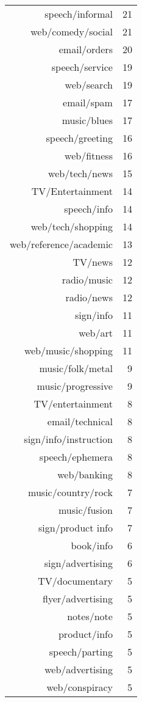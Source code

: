\begin{table}[ht]
\begin{tabular}{rr}
  speech/informal &  21 \\ 
  web/comedy/social &  21 \\ 
  email/orders &  20 \\ 
  speech/service &  19 \\ 
  web/search &  19 \\ 
  email/spam &  17 \\ 
  music/blues &  17 \\ 
  speech/greeting &  16 \\ 
  web/fitness &  16 \\ 
  web/tech/news &  15 \\ 
  TV/Entertainment &  14 \\ 
  speech/info &  14 \\ 
  web/tech/shopping &  14 \\ 
  web/reference/academic &  13 \\ 
  TV/news &  12 \\ 
  radio/music &  12 \\ 
  radio/news &  12 \\ 
  sign/info &  11 \\ 
  web/art &  11 \\ 
  web/music/shopping &  11 \\ 
  music/folk/metal &   9 \\ 
  music/progressive &   9 \\ 
  TV/entertainment &   8 \\ 
  email/technical &   8 \\ 
  sign/info/instruction &   8 \\ 
  speech/ephemera &   8 \\ 
  web/banking &   8 \\ 
  music/country/rock &   7 \\ 
  music/fusion &   7 \\ 
  sign/product info &   7 \\ 
  book/info &   6 \\ 
  sign/advertising &   6 \\ 
  TV/documentary &   5 \\ 
  flyer/advertising &   5 \\ 
  notes/note &   5 \\ 
  product/info &   5 \\ 
  speech/parting &   5 \\ 
  web/advertising &   5 \\ 
  web/conspiracy &   5 \\ 

\end{tabular}
\end{table}
